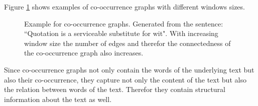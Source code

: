 Figure \ref{fig:cooccurrence_graphs} shows examples of co-occurrence graphs with different windows sizes.

\begin{figure}[ht]%
    \centering
    \caption{Example for co-occurrence graphs. Generated from the sentence: ``Quotation is a serviceable substitute for wit". With increasing window size the number of edges and therefor the connectedness of the co-occurrence graph also increases.}%
    \label{fig:cooccurrence_graphs}%
\end{figure}

Since co-occurrence graphs not only contain the words of the underlying text but also their co-occurrence, they capture not only the content of the text but also the relation between words of the text.
Therefor they contain structural information about the text as well.


